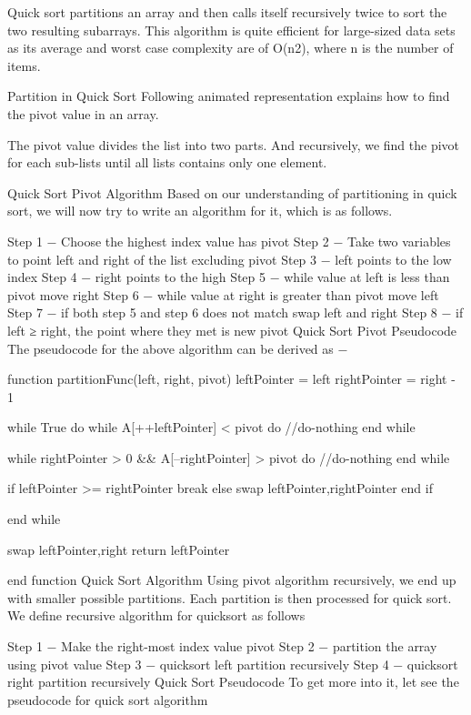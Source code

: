 Quick sort partitions an array and then calls itself recursively twice to sort the two resulting subarrays. This algorithm is quite efficient for large-sized data sets as its average and worst case complexity are of Ο(n2), where n is the number of items.

Partition in Quick Sort
Following animated representation explains how to find the pivot value in an array.



The pivot value divides the list into two parts. And recursively, we find the pivot for each sub-lists until all lists contains only one element.

Quick Sort Pivot Algorithm
Based on our understanding of partitioning in quick sort, we will now try to write an algorithm for it, which is as follows.

Step 1 − Choose the highest index value has pivot
Step 2 − Take two variables to point left and right of the list excluding pivot
Step 3 − left points to the low index
Step 4 − right points to the high
Step 5 − while value at left is less than pivot move right
Step 6 − while value at right is greater than pivot move left
Step 7 − if both step 5 and step 6 does not match swap left and right
Step 8 − if left ≥ right, the point where they met is new pivot
Quick Sort Pivot Pseudocode
The pseudocode for the above algorithm can be derived as −

function partitionFunc(left, right, pivot)
   leftPointer = left
   rightPointer = right - 1

   while True do
      while A[++leftPointer] < pivot do
         //do-nothing
      end while

      while rightPointer > 0 && A[--rightPointer] > pivot do
         //do-nothing
      end while

      if leftPointer >= rightPointer
         break
      else
         swap leftPointer,rightPointer
      end if

   end while

   swap leftPointer,right
   return leftPointer

end function
Quick Sort Algorithm
Using pivot algorithm recursively, we end up with smaller possible partitions. Each partition is then processed for quick sort. We define recursive algorithm for quicksort as follows

Step 1 − Make the right-most index value pivot
Step 2 − partition the array using pivot value
Step 3 − quicksort left partition recursively
Step 4 − quicksort right partition recursively
Quick Sort Pseudocode
To get more into it, let see the pseudocode for quick sort algorithm

